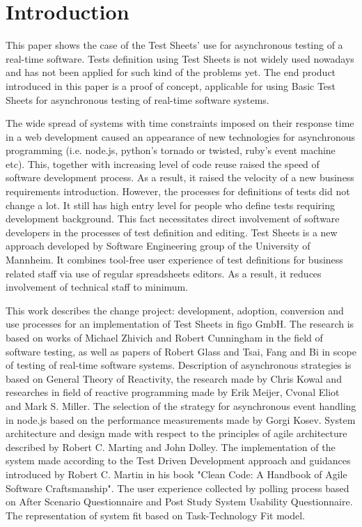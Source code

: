\chapter{Introduction}
\label{chap:intro}
This paper shows the case of the Test Sheets' use for asynchronous testing of a real-time software. Tests definition using Test Sheets is not widely used nowadays and has not been applied for such kind of the problems yet.
The end product introduced in this paper is a proof of concept,  applicable for using Basic Test Sheets for asynchronous testing of real-time software systems.

The wide spread of systems with time constraints imposed on their response time in a web development caused an appearance of new technologies for asynchronous programming (i.e. node.js, python's tornado or twisted, ruby's event machine etc). 
This, together with increasing level of code reuse raised the speed of software development process.
As a result, it raised the velocity of a new business requirements introduction.
However, the processes for definitions of tests did not change a lot. 
It still has high entry level for people who define tests requiring development background.
This fact necessitates direct involvement of software developers in the processes of test definition and editing.
Test Sheets is a new approach developed by Software Engineering group of the University of Mannheim. 
It combines  tool-free user experience of test definitions for business related staff via use of regular spreadsheets editors.
As a result, it reduces involvement of technical staff to minimum.


This work describes the change project: development, adoption, conversion and use processes for an implementation of Test Sheets in figo GmbH. The research is based on works of Michael Zhivich and Robert Cunningham in the field of software testing, as well as papers of Robert Glass and Tsai, Fang  and Bi in scope of testing of real-time software systems.
Description of asynchronous strategies is based on General Theory of Reactivity, the research made by Chris Kowal and researches in field of reactive programming made by Erik Meijer, Cvonal Eliot and Mark S. Miller. 
The selection of the strategy for asynchronous event handling in node.js based on the performance measurements made by Gorgi Kosev. 
System  architecture and design made with respect to the principles of agile architecture described by Robert  C. Marting and John Dolley. 
The implementation of the system made according to the Test Driven Development approach and guidances introduced by Robert C. Martin in his book "Clean Code: A Handbook of Agile Software Craftsmanship".
The user experience collected by polling process based on After Scenario Questionnaire and Post Study System Usability Questionnaire.
The representation of system fit based on Task-Technology Fit model.

